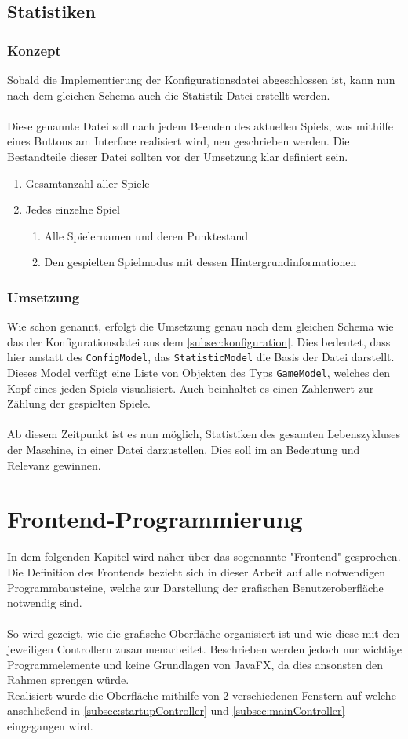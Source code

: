 \subsection{Statistiken}
\subsubsection{Konzept}
Sobald die Implementierung der Konfigurationsdatei abgeschlossen ist, kann nun nach dem gleichen Schema auch die Statistik-Datei erstellt werden.\\\\
Diese genannte Datei soll nach jedem Beenden des aktuellen Spiels, was mithilfe eines Buttons am Interface realisiert wird, neu geschrieben werden.
Die Bestandteile dieser Datei sollten vor der Umsetzung klar definiert sein.
\begin{enumerate}
\item Gesamtanzahl aller Spiele
\item Jedes einzelne Spiel
\begin{enumerate}
\item Alle Spielernamen und deren Punktestand
\item Den gespielten Spielmodus mit dessen Hintergrundinformationen
\end{enumerate}
\end{enumerate}
\subsubsection{Umsetzung}
Wie schon genannt, erfolgt die Umsetzung genau nach dem gleichen Schema wie das der Konfigurationsdatei aus dem \autoref{subsec:konfiguration}.
Dies bedeutet, dass hier anstatt des \lstinline[style=java]{ConfigModel}, das \lstinline[style=java]{StatisticModel} die Basis der Datei darstellt.
Dieses Model verfügt eine Liste von Objekten des Typs \lstinline[style=java]{GameModel}, welches den Kopf eines jeden Spiels visualisiert.
Auch beinhaltet es einen Zahlenwert zur Zählung der gespielten Spiele.\\\\
Ab diesem Zeitpunkt ist es nun möglich, Statistiken des gesamten Lebenszykluses der Maschine, in einer Datei darzustellen.
Dies soll im  an Bedeutung und Relevanz gewinnen.
\section{Frontend-Programmierung}
In dem folgenden Kapitel wird näher über das sogenannte "Frontend" gesprochen.
Die Definition des Frontends bezieht sich in dieser Arbeit auf alle notwendigen Programmbausteine, welche zur Darstellung der grafischen Benutzeroberfläche notwendig sind.\\\\
So wird gezeigt, wie die grafische Oberfläche organisiert ist und wie diese mit den jeweiligen Controllern zusammenarbeitet.
Beschrieben werden jedoch nur wichtige Programmelemente und keine Grundlagen von JavaFX, da dies ansonsten den Rahmen sprengen würde.\\
Realisiert wurde die Oberfläche mithilfe von 2 verschiedenen Fenstern auf welche anschließend in \autoref{subsec:startupController} und \autoref{subsec:mainController} eingegangen wird.
